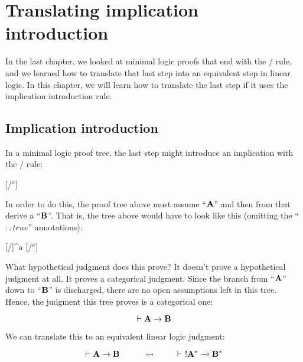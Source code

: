 \documentclass[../../../main.tex]{subfiles}
\begin{document}
\chapter{Translating implication introduction}

In the last chapter, we looked at minimal logic proofs that end with the \startrule/ rule, and we learned how to translate that last step into an equivalent step in linear logic. In this chapter, we will learn how to translate the last step if it uses the implication introduction rule.


\section{Implication introduction}

In a minimal logic proof tree, the last step might introduce an implication with the \implIntro/ rule:

\begin{prooftree*}
  \hypo{}
  \ellipsis{}{}
  [\implElim/$^{a}$]{}
\end{prooftree*}

\noindent
In order to do this, the proof tree above must assume ``$\mathbf{A}$'' and then from that derive a ``$\mathbf{B}$''. That is, the tree above would have to look like this (omitting the ``$:: true$'' annotations):

\begin{prooftree*}
  \hypo{}
  [\startrule/]{^{a}}
  [\implElim/$^{a}$]{}
\end{prooftree*}

\noindent
What hypothetical judgment does this prove? It doesn't prove a hypothetical judgment at all. It proves a categorical judgment. Since the branch from ``$\mathbf{A}$'' down to ``$\mathbf{B}$'' is discharged, there are no open assumptions left in this tree. Hence, the judgment this tree proves is a categorical one:

\begin{equation*}
  \ndturnstile/ \nd{A \impl/ B}
\end{equation*}

\noindent
We can translate this to an equivalent linear logic judgment:

\begin{equation*}
  \ndturnstile/ \nd{A \impl/ B}
  \hskip 1cm \rightsquigarrow \hskip 1cm 
  \ndturnstile/~\bang/\nd{A}^{*} \lolli/ \nd{B}^{*}
\end{equation*}
\end{document}
